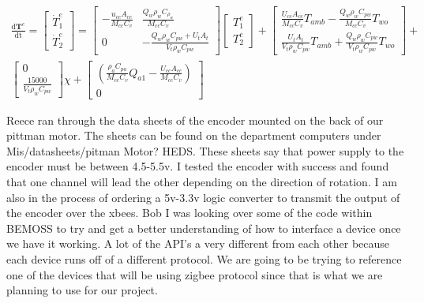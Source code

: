 \documentclass[fontsize=11pt, %
                             paper=letter, %
                             twoside, %
                             captions=tableheading,
                             index=totoc,
                             hyperref]{labbook}
\begin{document}

\begin{multline*}
    \label{eq:HVAC-Modeling}
    \frac{\mathrm{d}\mathbf{T}^e}{\mathrm{dt}} = 
    \begin{bmatrix}
    \dot{T}_1^e\\
    \dot{T}_2^e    
    \end{bmatrix}
    = 
    \begin{bmatrix}
    -\frac{u_{cc}A_{cc}}{M_{cc}C_v} & \frac{Q_w\rho_w C_{\rho_w}}{M_{cc}C_v}\\
    0 &  -\frac{Q_w\rho_wC_{pw}+U_tA_t}{V_t\rho_wC_{pw}}
    \end{bmatrix}
    \begin{bmatrix}
    T_1^e\\
    T_2^e
    \end{bmatrix}
    +
    \begin{bmatrix}
    \frac{U_{cc}A_{cc}}{M_{cc}C_v}T_{amb} - \frac{Q_w\rho_wC_{pw}}{M_{cc}C_v}T_{wo} \\
    \frac{U_tA_t}{V_t\rho_wC_{pw}}T_{amb} + \frac{Q_w\rho_wC_{pw}}{V_t\rho_wC_{pw}}T_{wo}
    \end{bmatrix}
    +\\
    \begin{bmatrix}
    0 \\
    \frac{15000}{V_t\rho_wC_{pw}}
    \end{bmatrix}
    \chi
    +
    \begin{bmatrix}
    (\frac{\rho_aC_{pa}}{M_{cc}C_v}Q_{a1}-\frac{U_{cc}A_{cc}}{M_{cc}C_v})\\
    0
    \end{bmatrix}    
\end{multline*}

Reece ran through the data sheets of the encoder mounted on the back of our pittman motor. The sheets can be found on the department computers under Mis/datasheets/pitman Motor? HEDS. These sheets say that power supply to the encoder must be between 4.5-5.5v. I tested the encoder with success and found that one channel will lead the other depending on the direction of rotation. I am also in the process of ordering a 5v-3.3v logic converter to transmit the output of the encoder over the xbees. 
Bob
I was looking over some of the code within BEMOSS to try and get a better understanding of how to interface a device once we have it working. A lot of the API's a very different from each other because each device runs off of a different protocol. We are going to be trying to reference one of the devices that will be using zigbee protocol since that is what we are planning to use for our project.
\end{document}
